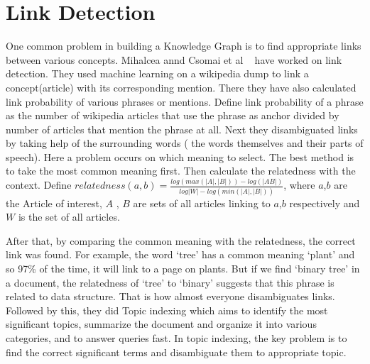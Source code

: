 \section{Link Detection}
One common problem in building a Knowledge Graph is to find appropriate links between various 
concepts. Mihalcea annd Csomai et al ~\cite{ref3LinkWikipedia} have worked on link detection. They used 
machine learning on a wikipedia dump to link a concept(article) with its corresponding mention. 
There they have also calculated 
link probability of various phrases or mentions. Define link probability of a phrase as the 
number of wikipedia articles that use the phrase as anchor divided by  number of articles that mention the phrase at all.
Next they disambiguated links by taking help of the surrounding words 
( the words themselves and their parts of speech). Here a problem occurs on which meaning to select.
The best method is to take the most common meaning first. Then calculate the relatedness
with the context. Define $ relatedness(a,b) = \frac{log(max(|A|, |B|)) - log(|AB|)}{log|W|-log(min(|A|, |B|))} $,
where $a$,$b$ are the Article of interest, $A$ , $B$ are sets of all articles linking to $a$,$b$ respectively and $W$ 
is the set of all articles.

After that, by comparing 
the  common meaning with the relatedness, the correct link was found. 
For example, the word `tree' has a common meaning `plant' and so 97\% of the time, it will link to a page on plants.
But if we find `binary tree' in a document, the relatedness of `tree' to `binary' suggests that this
phrase is related to data structure. That is how almost everyone disambiguates links. Followed by this, they 
did Topic indexing which aims to identify the most significant topics, summarize the document and organize it 
into various categories, and to answer queries fast. In topic indexing, the key problem is to find the correct significant 
terms and disambiguate them to appropriate topic.   



